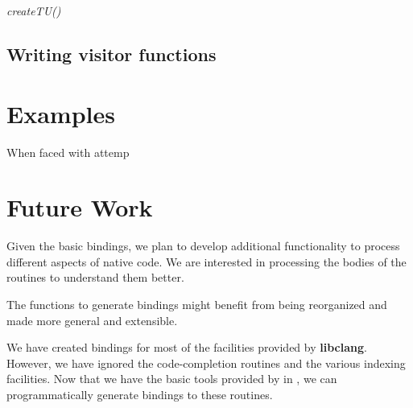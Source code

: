 \documentclass[article]{jss}
\def\R{\proglang{R}}
\def\Rpkg#1{\pkg{#1}}
\def\Rfunc#1{\textsl{#1()}}
\def\libclang{\textbf{libclang}}
\begin{document}
\Rfunc{createTU}


\subsection{Writing visitor functions}

\section{Examples}

When faced with attemp


\section{Future Work}

Given the basic bindings, we plan to develop additional functionality
to process different aspects of native code. We are interested in
processing the bodies of the routines to understand them better.

The functions to generate bindings might benefit from being
reorganized and made more general and extensible.

We have created bindings for most of the facilities provided by
\libclang.  However, we have ignored the code-completion routines and
the various indexing facilities.  Now that we have the basic tools
provided by \Rpkg{RCIndex} in \R, we can programmatically generate
bindings to these routines. 



\end{document}
